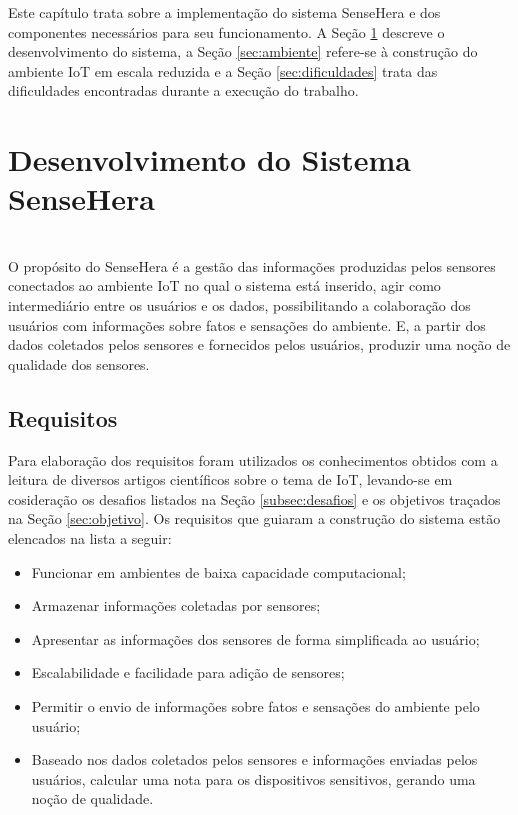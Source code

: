 
\quad Este capítulo trata sobre a implementação do sistema SenseHera e dos componentes necessários para seu funcionamento. A Seção \ref{sec:construcao} descreve o desenvolvimento do sistema, a Seção \ref{sec:ambiente} refere-se à construção do ambiente \acrshort{IoT} em escala reduzida e a Seção \ref{sec:dificuldades} trata das dificuldades encontradas durante a execução do trabalho.
\section{Desenvolvimento do Sistema SenseHera}
\label{sec:construcao}
\\\null \quad O propósito do SenseHera é a gestão das informações produzidas pelos sensores conectados ao ambiente \acrshort{IoT} no qual o sistema está inserido, agir como intermediário entre os usuários e os dados, possibilitando a colaboração dos usuários com informações sobre fatos e sensações do ambiente. E, a partir dos dados coletados pelos sensores e fornecidos pelos usuários, produzir uma noção de qualidade dos sensores.

\subsection{Requisitos}
\null \quad Para elaboração dos requisitos foram utilizados os conhecimentos obtidos com a leitura de diversos artigos científicos sobre o tema de \acrlong{IoT}, levando-se em cosideração os desafios listados na Seção \ref{subsec:desafios} e os objetivos traçados na Seção \ref{sec:objetivo}. Os requisitos que guiaram a construção do sistema estão elencados na lista a seguir:
\begin{itemize}
  \item Funcionar em ambientes de baixa capacidade computacional;
  \item Armazenar informações coletadas por sensores;
  \item Apresentar as informações dos sensores de forma simplificada ao usuário;
  \item Escalabilidade e facilidade para adição de sensores;
  \item Permitir o envio de informações sobre fatos e sensações do ambiente pelo usuário;
  \item Baseado nos dados coletados pelos sensores e informações enviadas pelos usuários, calcular uma nota para os dispositivos sensitivos, gerando uma noção de qualidade.
\end{itemize}


